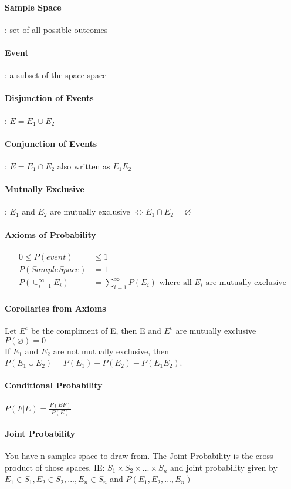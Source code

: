 
\paragraph{Sample Space}: set of all possible outcomes
\paragraph{Event}: a subset of the space space

\paragraph{Disjunction of Events}:  $E = E_1 \cup E_2$
\paragraph{Conjunction of Events}:  $E = E_1 \cap E_2$ also written as $E_1 E_2$

\paragraph{Mutually Exclusive}: $E_1$ and $E_2$ are mutually exclusive $ \iff E_1 \cap E_2 = \varnothing $

\paragraph{Axioms of Probability}
\begin{align*}
	0 \le P(event) & \le 1 \\
	P(SampleSpace) &= 1 \\
	P(\cup_{i=1}^\infty E_i ) &= \sum_{i=1}^\infty P(E_i) \mbox{ where all } E_i \mbox{ are mutually exclusive}
\end{align*}

\paragraph{Corollaries from Axioms}
Let $E^c$ be the compliment of E, then E and $E^c$ are mutually exclusive \\
$P(\varnothing) = 0$ \\
If $E_1$ and $E_2$ are not mutually exclusive, then $P(E_1 \cup E_2) = P(E_1) +
P(E_2) - P(E_1 E_2)$.

\paragraph{Conditional Probability} $P(F|E) = \frac{P(EF)}{P(E)}$
\paragraph{Joint Probability} You have n samples space to draw from. The Joint
Probability is the cross product of those spaces.
IE:
$S_1 \times S_2 \times ... \times S_n$
and joint probability given by $E_1 \in S_1 , E_2 \in S_2 , ... , E_n \in S_n$
and
$P(E_1 , E_2  , ... , E_n )$

